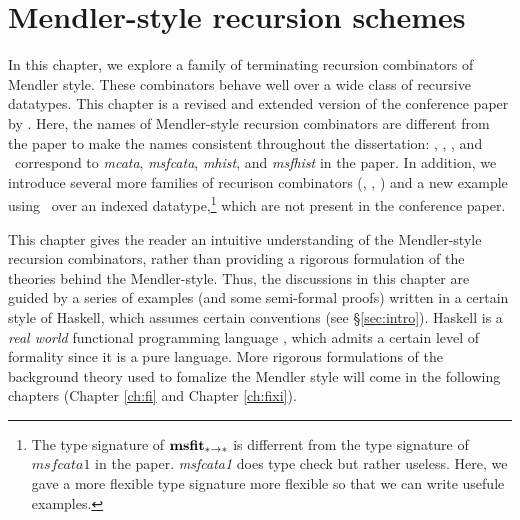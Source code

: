 \chapter{Mendler-style recursion schemes}\label{ch:mendler}
In this chapter, we explore a family of terminating recursion combinators
of Mendler style. These combinators behave well over a wide class of
recursive datatypes. This chapter is a revised and extended version of
the conference paper by \citet{AhnShe11}. Here, the names of Mendler-style
recursion combinators are different from the paper to make the names
consistent throughout the dissertation: \MIt, \MsfIt, \McvIt, and
\MsfcvIt\ correspond to \textit{mcata}, \textit{msfcata}, \textit{mhist},
and \textit{msfhist} in the paper. In addition, we introduce several
more families of recurison combinators (\MPr, \McvPr, \McvPr)
and a new example using \MsfIt\ over an indexed datatype,\footnote{
	The type signature of $\mathbf{msfit}_{* -> *}$ is differrent
	from the type signature of $\textit{msfcata1}$ in the paper. 
	\textit{msfcata1} does type check but rather useless.
	Here, we gave a more flexible type signature more flexible
	so that we can write usefule examples.}
which are not present in the conference paper.

This chapter gives the reader an intuitive understanding of the Mendler-style
recursion combinators, rather than providing a rigorous formulation of
the theories behind the Mendler-style. Thus, the discussions in this chapter
are guided by a series of examples (and some semi-formal proofs) written
in a certain style of Haskell, which assumes certain conventions
(see \S\ref{sec:intro}).  Haskell is a \emph{real world}
functional programming language \cite{OSullivan08}, which admits
a certain level of formality since it is a pure language.
More rigorous formulations of the background theory used to fomalize
the Mendler style will come in the following chapters
(Chapter \ref{ch:fi} and Chapter \ref{ch:fixi}).





